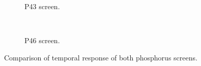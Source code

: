 \begin{figure}[!ht]
	\begin{subfigure}{0.5\textwidth}
		
		\caption{P43 screen.}
		\label{}
	\end{subfigure}
	~
	\begin{subfigure}{0.5\textwidth}
		
		\caption{P46 screen.}
		\label{}
	\end{subfigure}
	\caption[Comparison of temporal response of both phosphorus screens]{Comparison of temporal response of both phosphorus screens.}
	\label{chap4:P_timing}
\end{figure}